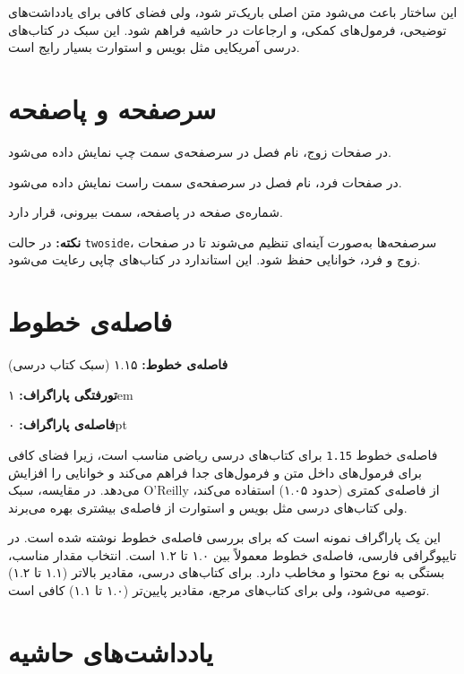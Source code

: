 \documentclass{matinbook}
\begin{document}
این ساختار باعث می‌شود متن اصلی باریک‌تر شود، ولی فضای
کافی برای یادداشت‌های توضیحی، فرمول‌های کمکی، و ارجاعات
در حاشیه فراهم شود.  این سبک در کتاب‌های درسی
آمریکایی مثل بویس و استوارت بسیار رایج است.

\section{سرصفحه و پاصفحه}
\label{sec:header-footer}

در صفحات زوج، نام فصل در سرصفحه‌ی سمت چپ نمایش داده می‌شود.

در صفحات فرد، نام فصل در سرصفحه‌ی سمت راست نمایش داده می‌شود.

شماره‌ی صفحه در پاصفحه، سمت بیرونی، قرار دارد.

\textbf{نکته:} در حالت \texttt{twoside}، سرصفحه‌ها به‌صورت
آینه‌ای تنظیم می‌شوند تا در صفحات زوج و فرد، خوانایی حفظ شود.
 این استاندارد در کتاب‌های چاپی رعایت می‌شود.

\section{فاصله‌ی خطوط}
\label{sec:line-spacing}

\textbf{فاصله‌ی خطوط:} ۱.۱۵ (سبک کتاب درسی)

\textbf{تورفتگی پاراگراف:} ۱em

\textbf{فاصله‌ی پاراگراف:} ۰pt

فاصله‌ی خطوط \texttt{1.15} برای کتاب‌های درسی ریاضی مناسب است،
زیرا فضای کافی برای فرمول‌های داخل متن و فرمول‌های جدا فراهم
می‌کند و خوانایی را افزایش می‌دهد. در مقایسه، سبک O'Reilly
از فاصله‌ی کمتری (حدود ۱.۰۵) استفاده می‌کند، ولی کتاب‌های
درسی مثل بویس و استوارت از فاصله‌ی بیشتری بهره می‌برند.

این یک پاراگراف نمونه است که برای بررسی فاصله‌ی خطوط نوشته
شده است. در تایپوگرافی فارسی، فاصله‌ی خطوط معمولاً بین
۱.۰ تا ۱.۲ است. انتخاب مقدار مناسب، بستگی به نوع محتوا
و مخاطب دارد. برای کتاب‌های درسی، مقادیر بالاتر (۱.۱ تا
۱.۲) توصیه می‌شود، ولی برای کتاب‌های مرجع، مقادیر پایین‌تر
(۱.۰ تا ۱.۱) کافی است.

\section{یادداشت‌های حاشیه}
\label{sec:margin-notes}
\end{document}
